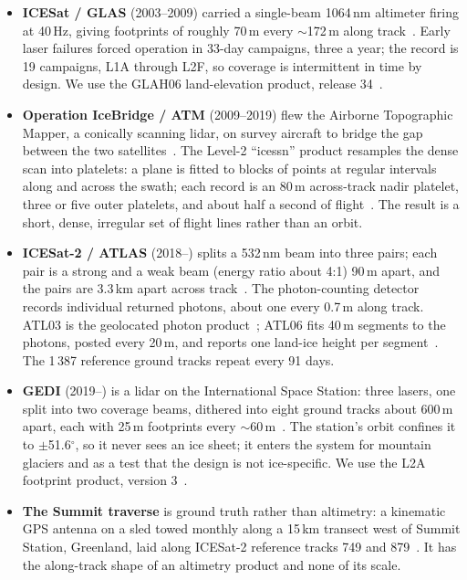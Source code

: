 \documentclass[10pt,a4paper]{article}
\begin{document}
\begin{itemize}
\item \textbf{ICESat / GLAS} (2003--2009) carried a single-beam 1064\,nm altimeter firing at 40\,Hz, giving footprints
  of roughly 70\,m every $\sim$172\,m along track~\citep{schutz2005}. Early laser failures forced operation in
  33-day campaigns, three a year; the record is 19 campaigns, L1A through L2F, so coverage is intermittent in time by
  design. We use the GLAH06 land-elevation product, release 34~\citep{glah06v34}.
\item \textbf{Operation IceBridge / ATM} (2009--2019) flew the Airborne Topographic Mapper, a conically scanning
  lidar, on survey aircraft to bridge the gap between the two satellites~\citep{krabill2002}. The Level-2
  ``icessn'' product resamples the dense scan into platelets: a plane is fitted to blocks of points at regular
  intervals along and across the swath; each record is an 80\,m across-track nadir platelet, three or five outer
  platelets, and about half a second of flight~\citep{blatm2guide,ilatm2v2}. The result is a
  short, dense, irregular set of flight lines rather than an orbit.
\item \textbf{ICESat-2 / ATLAS} (2018--) splits a 532\,nm beam into three pairs; each pair is a strong and a weak beam
  (energy ratio about 4:1) 90\,m apart, and the pairs are 3.3\,km apart across track~\citep{markus2017}. The
  photon-counting detector records individual returned photons, about one every 0.7\,m along track. ATL03 is the
  geolocated photon product~\citep{neumann2019,atl03v7}; ATL06 fits 40\,m segments to the photons, posted every
  20\,m, and reports one land-ice height per segment~\citep{smith2019,atl06v7}. The 1\,387 reference ground tracks
  repeat every 91 days.
\item \textbf{GEDI} (2019--) is a lidar on the International Space Station: three lasers, one split into two
  coverage beams, dithered into eight ground tracks about 600\,m apart, each with 25\,m footprints every
  $\sim$60\,m~\citep{dubayah2020,gedigeometry}. The station's orbit confines it to $\pm$51.6$^\circ$, so it never
  sees an ice sheet; it enters the system for mountain glaciers and as a test that the design is not ice-specific.
  We use the L2A footprint product, version 3~\citep{gedi02av3}.
\item \textbf{The Summit traverse} is ground truth rather than altimetry: a kinematic GPS antenna on a sled towed
  monthly along a 15\,km transect west of Summit Station, Greenland, laid along ICESat-2 reference tracks 749 and
  879~\citep{is2tgpsss}. It has the along-track shape of an altimetry product and none of its scale.
\end{itemize}
\end{document}
